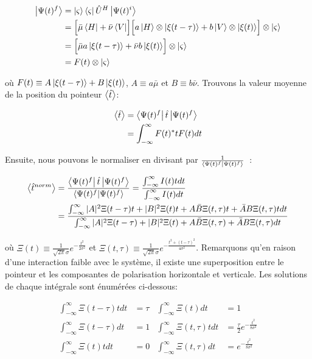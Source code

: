\begin{onehalfspace}
    \begin{align}
        \ket{\Psi(t)^f} &= \ket{\varsigma}\bra{\varsigma}\hat{U}^H\ket{\Psi(t)^i} \\
        &= \Bigl[ \bar{\mu}\bra{H} + \bar{\nu}\bra{V} \Bigr]\Bigl[ a\ket{H} \otimes \ket{\xi(t-\tau)} + b\ket{V} \otimes \ket{\xi(t)} \Bigr] \otimes \ket{\varsigma}\\
        &= \Bigl[\bar{\mu}a\ket{\xi(t-\tau)} + \bar{\nu}b\ket{\xi(t)}\Bigr] \otimes \ket{\varsigma}\\
        &= F(t)\otimes\ket{\varsigma}
    \end{align}

    \noindent où $F(t) \equiv A\ket{\xi(t-\tau)} + B\ket{\xi(t)}$, 
    $A \equiv a\bar{\mu}$ et $B \equiv b\bar{\nu}$. Trouvons la valeur 
    moyenne de la position du pointeur $\expval{\hat{t}}$:

    \begin{align}
        \expval{\hat{t}} &= \bra{\Psi(t)^f}\hat{t}\ket{\Psi(t)^f}\\
        &= \int_{-\infty}^{\infty} F(t)^* t F(t) dt
    \end{align}

    \noindent Ensuite, nous pouvons le normaliser en 
    divisant par $\frac{1}{\bra{\Psi(t)^f}\ket{\Psi(t)^f}}$ :

    \begin{align}
        \expval{\hat{t}^{norm}} &= \frac{\bra{\Psi(t)^f}\hat{t}\ket{\Psi(t)^f}}{\bra{\Psi(t)^f}\ket{\Psi(t)^f}} = \frac{\int_{-\infty}^{\infty} I(t)tdt}{\int_{-\infty}^{\infty} I(t)dt}\\
        &= \frac{\int_{-\infty}^{\infty} |A|^2\Xi(t - \tau)t + |B|^2\Xi(t)t + A\bar{B}\Xi(t, \tau)t + \bar{A}B\Xi(t, \tau)t dt}{\int_{-\infty}^{\infty} |A|^2\Xi(t - \tau) + |B|^2\Xi(t) + A\bar{B}\Xi(t, \tau) + \bar{A}B\Xi(t, \tau) dt}\label{eq:t_norm_interférence}
    \end{align}

    \noindent où $\Xi(t) \equiv \frac{1}{\sqrt{2\pi}\sigma}e^{-\frac{t^2}{2\sigma^2}}$ 
    et $\Xi(t, \tau) \equiv \frac{1}{\sqrt{2\pi}\sigma}e^{-\frac{t^2 + (t - \tau)^2}{4\sigma^2}}$. 
    Remarquons qu’en raison d’une interaction faible avec le système, il 
    existe une superposition entre le pointeur et les composantes de 
    polarisation horizontale et verticale. Les solutions de chaque 
    intégrale sont énumérées ci-dessous:

    \begin{align*}
        \int_{-\infty}^{\infty} \Xi(t - \tau)t dt &= \tau & \int_{-\infty}^{\infty} \Xi(t) dt &= 1\\
        \int_{-\infty}^{\infty} \Xi(t - \tau) dt &= 1 & \int_{-\infty}^{\infty} \Xi(t, \tau)t dt &= \frac{\tau}{2}e^{-\frac{t^2}{8\sigma^2}}\\
        \int_{-\infty}^{\infty} \Xi(t)t dt &= 0 & \int_{-\infty}^{\infty} \Xi(t, \tau) dt &= e^{-\frac{t^2}{8\sigma^2}}
    \end{align*}


\end{onehalfspace}
